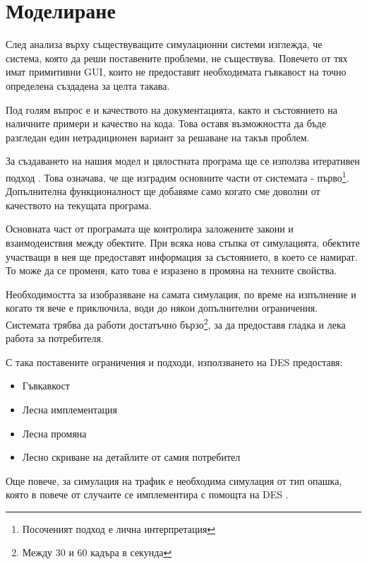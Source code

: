 \section{Моделиране}
	
	След анализа върху съществуващите симулационни системи изглежда, че
	система, която да реши поставените проблеми, не съществува.
	Повечето от тях имат примитивни \ac{GUI}, които не предоставят
	необходимата гъвкавост на точно определена създадена за целта такава.
	
	Под голям въпрос е и качеството на документацията, както и състоянието на
	наличните примери и качество на кода. Това оставя възможността да бъде разгледан
	един нетрадиционен вариант за решаване на такъв проблем.
	
	За създаването на нашия модел и цялостната програма ще се използва итеративен подход \cite{ArtOfAgile}.
	Това означава, че ще изградим основните части от системата - 
	първо\footnote{Посоченият подход е лична интерпретация}. Допълнителна 
	функционалност ще добавяме само когато сме доволни от качеството на текущата програма. 
			
	Основната част от програмата ще контролира заложените закони и взаимодеиствия между обектите.
	При всяка нова стъпка от симулацията, обектите участващи в нея ще предоставят информация за
	състоянието, в което се намират. То може да се променя, като това е изразено в промяна
	на техните свойства.
	
	Необходимостта за изобразяване на самата симулация, по време на изпълнение и когато тя вече е приключила,
	води до някои допълнителни ограничения. Системата трябва да работи достатъчно бързо\footnote{Между 30 и 60 кадъра в секунда},
	за да предоставя гладка и лека работа за потребителя.
	
	С така поставените ограничения и подходи, използването на \ac{DES} предоставя:
	
	\begin{itemize}
		\item Гъвкавкост
		
		\item Лесна имплементация
		
		\item Лесна промяна
		
		\item Лесно скриване на детайлите от самия потребител	
				
	\end{itemize}				
	
	Още повече, за симулация на трафик е необходима симулация от тип опашка, която в повече от случаите
	се имплементира с помощта на \ac{DES} \cite{Barlas}.
	
